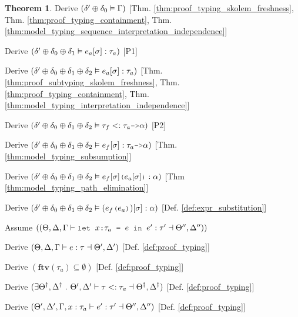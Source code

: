 \documentclass[acmsmall]{acmart}
\theoremstyle{definition}
\newtheorem{theorem}{Theorem}[section]
\begin{document}
\begin{theorem}
  \item \I\I \N Derive $(
    \delta' \oplus \delta_0 \vDash \Gamma
  )$ [Thm. \ref{thm:proof_typing_skolem_freshness},
      Thm. \ref{thm:proof_typing_containment},
      Thm. \ref{thm:model_typing_sequence_interpretation_independence}]

  \item \I\I \N Derive $(
    \delta' \oplus \delta_0 \oplus \delta_1 \vDash e_a[\sigma] : \tau_a
  )$ [P1]

  \item \I\I \N Derive $(
    \delta' \oplus \delta_0 \oplus \delta_1 \oplus \delta_2 \vDash e_a[\sigma] : \tau_a
  )$ [Thm. \ref{thm:proof_subtyping_skolem_freshness}, 
      Thm. \ref{thm:proof_typing_containment},
      Thm. \ref{thm:model_typing_interpretation_independence}]

  \item \I\I \N Derive $(
    \delta' \oplus \delta_0 \oplus \delta_1 \oplus \delta_2  \satisfies \tau_f \subtypes \tau_a \J{->} \alpha
  )$ [P2]

  \item \I\I \N Derive $(
    \delta' \oplus \delta_0 \oplus \delta_1 \oplus \delta_2 \satisfies e_f[\sigma] \hastype \tau_a \J{->} \alpha
  )$ [Thm. \ref{thm:model_typing_subsumption}]

  \item \I\I \N Derive $(
    \delta' \oplus \delta_0 \oplus \delta_1 \oplus \delta_2 \satisfies e_f[\sigma]\J{(}e_a[\sigma]\J{)} \hastype \alpha
  )$ [Thm \ref{thm:model_typing_path_elimination}]

  \item \I\I \N Derive $(
    \delta' \oplus \delta_0 \oplus \delta_1 \oplus \delta_2 \satisfies (e_f\J{(}e_a\J{)})[\sigma] \hastype \alpha
  )$ [Def. \ref{def:expr_substitution}]


  \item \N Assume $(
    (\Theta, \Delta, \Gamma \entails \J{let } x \J{:} \tau_a \J{ = } e \J{ in } e' \hastype \tau' \given \Theta'', \Delta'')
  )$
  \item \I \N Derive $(
    \Theta, \Delta, \Gamma \vdash e : \tau \dashv \Theta', \Delta' 
  )$ [Def. \ref{def:proof_typing}]
  \item \I \N Derive $(
    \textbf{ftv}(\tau_a) \subseteq \emptyset
  )$ [Def. \ref{def:proof_typing}]
  \item \I \N Derive $(
    \exists \Theta^\dagger, \Delta^\dagger \ .\  \Theta', \Delta' \vdash \tau <: \tau_a \dashv \Theta^\dagger, \Delta^\dagger
  )$ [Def. \ref{def:proof_typing}]
  \item \I \N Derive $(
    \Theta', \Delta', \Gamma, x:\tau_a \vdash e' : \tau' \dashv \Theta'', \Delta''
  )$ [Def. \ref{def:proof_typing}]



\end{theorem}
\end{document}
